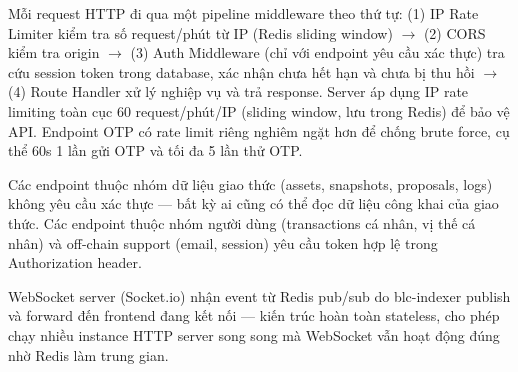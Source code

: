 \documentclass[../DoAn.tex]{subfiles}
\begin{document}
\begin{table}[H]
\centering
{}
\caption{Các nhóm endpoint của hệ thống}
\label{table:api_groups}
\end{table}


Mỗi request HTTP đi qua một pipeline middleware theo thứ tự: (1) IP Rate Limiter kiểm tra số request/phút từ IP (Redis sliding window) $\rightarrow$ (2) CORS kiểm tra origin $\rightarrow$ (3) Auth Middleware (chỉ với endpoint yêu cầu xác thực) tra cứu session token trong database, xác nhận chưa hết hạn và chưa bị thu hồi $\rightarrow$ (4) Route Handler xử lý nghiệp vụ và trả response. Server áp dụng IP rate limiting toàn cục 60 request/phút/IP (sliding window, lưu trong Redis) để bảo vệ API. Endpoint OTP có rate limit riêng nghiêm ngặt hơn để chống brute force, cụ thể 60s 1 lần gửi OTP và tối đa 5 lần thử OTP.

Các endpoint thuộc nhóm dữ liệu giao thức (assets, snapshots, proposals, logs) không yêu cầu xác thực --- bất kỳ ai cũng có thể đọc dữ liệu công khai của giao thức. Các endpoint thuộc nhóm người dùng (transactions cá nhân, vị thế cá nhân) và off-chain support (email, session) yêu cầu token hợp lệ trong Authorization header.

WebSocket server (Socket.io) nhận event từ Redis pub/sub do blc-indexer publish và forward đến frontend đang kết nối --- kiến trúc hoàn toàn stateless, cho phép chạy nhiều instance HTTP server song song mà WebSocket vẫn hoạt động đúng nhờ Redis làm trung gian.
\end{document}
